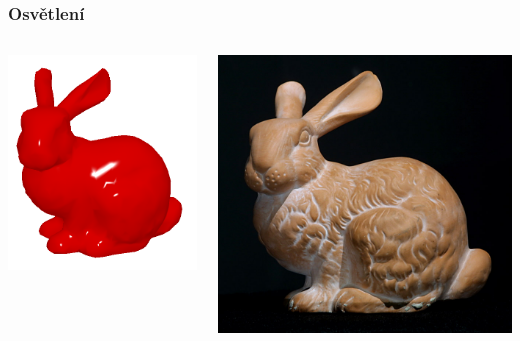 \begin{frame}
    \frametitle{Osvětlení}

    \begin{columns}[c]

    \includegraphics[width=\textwidth]{pics/physicallyBasedRendering/bunny}


    \includegraphics[width=\textwidth]{pics/physicallyBasedRendering/stanford-bunny}
    
    \end{columns}
\end{frame}

